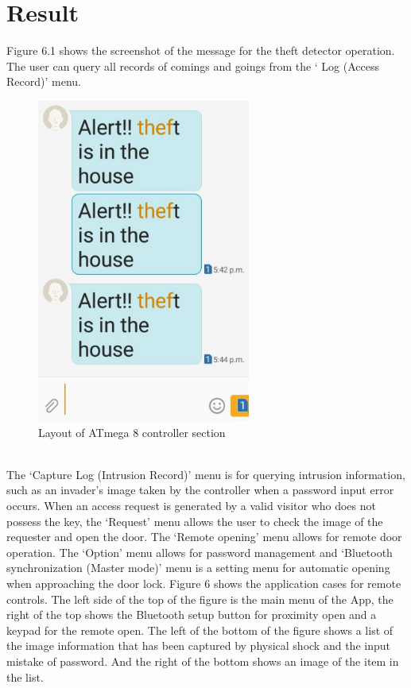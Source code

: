 \documentclass[twoside,a4paper,16pt]{book}
\begin{document}
{ \section{Result}
 Figure 6.1 shows the screenshot of the message for the theft detector operation. The user can query all records of comings and goings from the ‘ Log (Access Record)’ menu.
 \begin{figure}[ht!]
 	\begin{center}
 		\includegraphics[width=7.0cm]{p3.jpeg}
 		\caption{Layout of ATmega 8 controller section }
 	\end{center}
 \end{figure}
\\
  The ‘Capture Log (Intrusion Record)’ menu is for querying intrusion information, such as an invader’s image taken by the controller when a password input error occurs. When an access request is generated by a valid visitor who does not possess the key, the ‘Request’ menu allows the user to check the image of the requester and open the door. The ‘Remote opening’ menu allows for remote door operation. The ‘Option’ menu allows for password management and ‘Bluetooth synchronization (Master mode)’ menu is a setting menu for automatic opening when approaching the door lock. Figure 6 shows the application cases for remote controls. The left side of the top of the figure is the main menu of the App, the right of the top shows the Bluetooth setup button for proximity open and a keypad for the remote open. The left of the bottom of the figure shows a list of the image information that has been captured by physical shock and the input mistake of password. And the right of the bottom shows an image of the item in the list.
}
\end{document}
